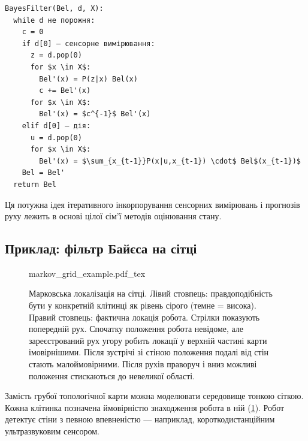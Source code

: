 \begin{Verbatim}[commandchars=\\\{\}, codes={\catcode`$=3\catcode`^=7\catcode`_=8}]
BayesFilter(Bel, d, X):
  while d не порожня:
    c = 0
    if d[0] — сенсорне вимірювання:
      z = d.pop(0)
      for $x \in X$:
        Bel'(x) = P(z|x) Bel(x)
        c += Bel'(x)
      for $x \in X$:
        Bel'(x) = $c^{-1}$ Bel'(x)
    elif d[0] — дія:
      u = d.pop(0)
      for $x \in X$:
        Bel'(x) = $\sum_{x_{t-1}}P(x|u,x_{t-1}) \cdot$ Bel$(x_{t-1})$
    Bel = Bel'
  return Bel
\end{Verbatim}

Ця потужна ідея ітеративного інкорпорування сенсорних вимірювань і прогнозів руху лежить в основі цілої сім'ї методів оцінювання стану.

\subsection{Приклад: фільтр Байєса на сітці}

\begin{figure}
    \centering
    \def\svgwidth{\textwidth}
    {markov_grid_example.pdf_tex}
    \caption{Марковська локалізація на сітці. Лівий стовпець: правдоподібність бути у конкретній клітинці як рівень сірого (темне = висока). Правий стовпець: фактична локація робота. Стрілки показують попередній рух. Спочатку положення робота невідоме, але зареєстрований рух угору робить локації у верхній частині карти імовірнішими. Після зустрічі зі стіною положення подалі від стін стають малоймовірними. Після рухів праворуч і вниз можливі положення стискаються до невеликої області.}
    \label{fig:markov_grid_example}
\end{figure}

Замість грубої топологічної карти можна моделювати середовище тонкою сіткою. Кожна клітинка позначена ймовірністю знаходження робота в ній (\cref{fig:markov_grid_example}). Робот детектує стіни з певною впевненістю — наприклад, короткодистанційним ультразвуковим сенсором.

